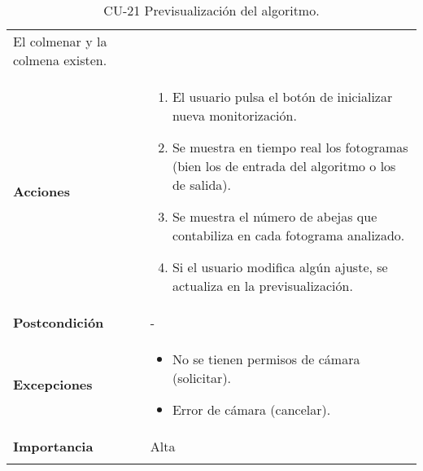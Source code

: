 \begin{longtable}[H]{@{}ll@{}}
\begin{minipage}[t]{0.68\columnwidth}
El colmenar y la colmena existen.\strut
\end{minipage}\tabularnewline
\begin{minipage}[t]{0.26\columnwidth}\raggedright\strut
\textbf{Acciones}\strut
\end{minipage} & \begin{minipage}[t]{0.68\columnwidth}\raggedright\strut
\begin{enumerate}
\def\labelenumi{\arabic{enumi}.}
\tightlist
\item
  El usuario pulsa el botón de inicializar nueva monitorización.
\item
  Se muestra en tiempo real los fotogramas (bien los de entrada del
  algoritmo o los de salida).
\item
  Se muestra el número de abejas que contabiliza en cada fotograma
  analizado.
\item
  Si el usuario modifica algún ajuste, se actualiza en la
  previsualización.
\end{enumerate}\strut
\end{minipage}\tabularnewline
\begin{minipage}[t]{0.26\columnwidth}\raggedright\strut
\textbf{Postcondición}\strut
\end{minipage} & \begin{minipage}[t]{0.68\columnwidth}\raggedright\strut
-\strut
\end{minipage}\tabularnewline
\begin{minipage}[t]{0.26\columnwidth}\raggedright\strut
\textbf{Excepciones}\strut
\end{minipage} & \begin{minipage}[t]{0.68\columnwidth}\raggedright\strut
\begin{itemize}
\tightlist
\item
  No se tienen permisos de cámara (solicitar).
\item
  Error de cámara (cancelar).
\end{itemize}\strut
\end{minipage}\tabularnewline
\begin{minipage}[t]{0.26\columnwidth}\raggedright\strut
\textbf{Importancia}\strut
\end{minipage} & \begin{minipage}[t]{0.68\columnwidth}\raggedright\strut
Alta\strut
\end{minipage}\tabularnewline
\bottomrule
\caption{CU-21 Previsualización del algoritmo.}
\end{longtable}

